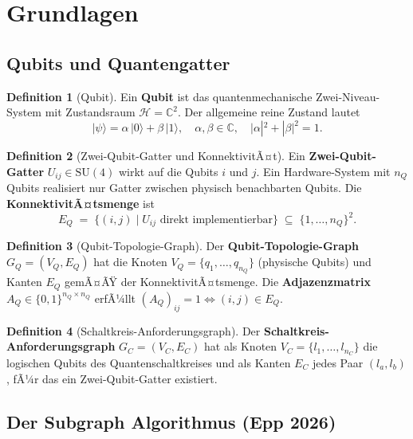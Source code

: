 ﻿\documentclass[a4paper,12pt]{article}
\theoremstyle{definition}
\newtheorem{definition}{Definition}
\begin{document}
\section{Grundlagen}
\label{sec:grundlagen}

\subsection{Qubits und Quantengatter}

\begin{definition}[Qubit]
Ein \textbf{Qubit} ist das quantenmechanische Zwei-Niveau-System mit Zustandsraum
$\mathcal{H} = \mathbb{C}^2$. Der allgemeine reine Zustand lautet
\[
  |\psi\rangle = \alpha\,|0\rangle + \beta\,|1\rangle,\quad
  \alpha,\beta\in\mathbb{C},\quad |\alpha|^2 + |\beta|^2 = 1.
\]
\end{definition}

\begin{definition}[Zwei-Qubit-Gatter und KonnektivitÃ¤t]
Ein \textbf{Zwei-Qubit-Gatter} $U_{ij} \in \mathrm{SU}(4)$ wirkt auf die Qubits $i$
und $j$. Ein Hardware-System mit $n_Q$ Qubits realisiert nur Gatter zwischen physisch
benachbarten Qubits. Die \textbf{KonnektivitÃ¤tsmenge} ist
\[
  E_Q \;=\; \{(i,j) \mid U_{ij} \text{ direkt implementierbar}\} \;\subseteq\;
  \{1,\ldots,n_Q\}^2.
\]
\end{definition}

\begin{definition}[Qubit-Topologie-Graph]
\label{def:topgraph}
Der \textbf{Qubit-Topologie-Graph} $G_Q = (V_Q, E_Q)$ hat die Knoten
$V_Q = \{q_1,\ldots,q_{n_Q}\}$ (physische Qubits) und Kanten $E_Q$ gemÃ¤ÃŸ der
KonnektivitÃ¤tsmenge. Die \textbf{Adjazenzmatrix} $A_Q \in \{0,1\}^{n_Q\times n_Q}$
erfÃ¼llt $(A_Q)_{ij} = 1 \Leftrightarrow (i,j)\in E_Q$.
\end{definition}

\begin{definition}[Schaltkreis-Anforderungsgraph]
Der \textbf{Schaltkreis-Anforderungsgraph} $G_C = (V_C, E_C)$ hat als Knoten
$V_C = \{l_1,\ldots,l_{n_C}\}$ die logischen Qubits des Quantenschaltkreises und
als Kanten $E_C$ jedes Paar $(l_a,l_b)$, fÃ¼r das ein Zwei-Qubit-Gatter existiert.
\end{definition}

\subsection{Der Subgraph Algorithmus (Epp 2026)}
\end{document}
